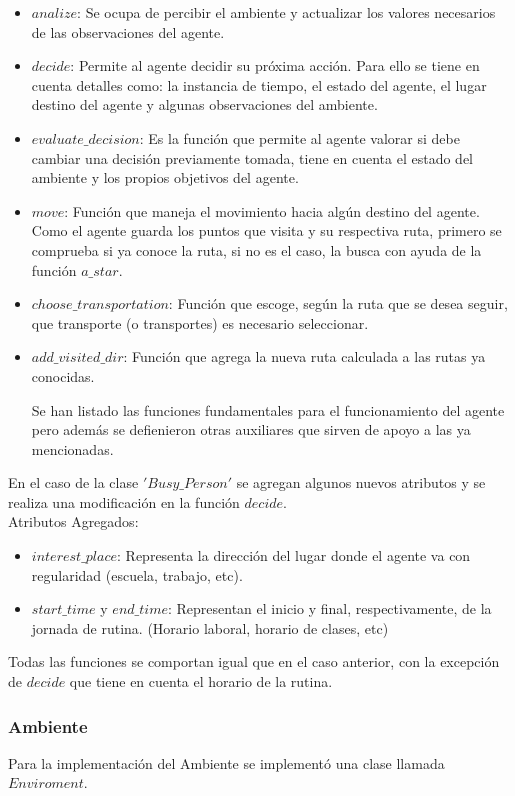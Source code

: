 \documentclass{article}
\begin{document}
\begin{itemize}
    \item $analize$: Se ocupa de percibir el ambiente y actualizar los valores necesarios de las observaciones del agente.
    \item $decide$: Permite al agente decidir su próxima acción. Para ello se tiene en cuenta detalles como: la instancia de tiempo, el estado del agente, el lugar destino del agente y algunas observaciones del ambiente.
    \item $evaluate\_decision$: Es la función que permite al agente valorar si debe cambiar una decisión previamente tomada, tiene en cuenta el estado del ambiente y los propios objetivos del agente.
    \item $move$: Función que maneja el movimiento hacia algún destino del agente. Como el agente guarda los puntos que visita y su respectiva ruta, primero se comprueba si ya conoce la ruta, si no es el caso, la busca con ayuda de la función $a\_star$.
    \item $choose\_transportation$: Función que escoge, según la ruta que se desea seguir, que transporte (o transportes) es necesario seleccionar. 
    \item $add\_visited\_dir$: Función que agrega la nueva ruta calculada a las rutas ya conocidas.
    
    Se han listado las funciones fundamentales para el funcionamiento del agente pero además se defienieron otras auxiliares que sirven de apoyo a las ya mencionadas.
\end{itemize}

En el caso de la clase $'Busy\_Person'$ se agregan algunos nuevos atributos y se realiza una modificación en la función $decide$.
\\

Atributos Agregados:
\begin{itemize}
    \item $interest\_place$: Representa la dirección del lugar donde el agente va con regularidad (escuela, trabajo, etc).
    \item $start\_time$ y $end\_time$: Representan el inicio y final, respectivamente, de la jornada de rutina. (Horario laboral, horario de clases, etc)
\end{itemize}

Todas las funciones se comportan igual que en el caso anterior, con la excepción de $decide$ que tiene en cuenta el horario de la rutina. 

\subsubsection{Ambiente}
Para la implementación del Ambiente se implementó una clase llamada $Enviroment$.
\\
\end{document}
